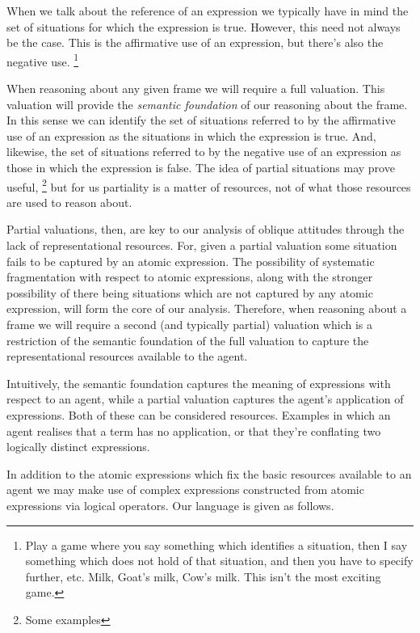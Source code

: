 \documentclass[10pt]{article}
\begin{document}
\newpage

\hfill
\printbibliography

\newpage

When we talk about the reference of an expression we typically have in mind the set of situations for which the expression is true.
However, this need not always be the case.
This is the affirmative use of an expression, but there's also the negative use.\nolinebreak
\footnote{Play a game where you say something which identifies a situation, then I say something which does not hold of that situation, and then you have to specify further, etc.
  Milk, Goat's milk, Cow's milk.
  This isn't the most exciting game.}


When reasoning about any given frame we will require a full valuation.
This valuation will provide the \emph{semantic foundation} of our reasoning about the frame.
In this sense we can identify the set of situations referred to by the affirmative use of an expression as the situations in which the expression is true.
And, likewise, the set of situations referred to by the negative use of an expression as those in which the expression is false.
The idea of partial situations may prove useful,\nolinebreak
\footnote{Some examples}
but for us partiality is a matter of resources, not of what those resources are used to reason about.

Partial valuations, then, are key to our analysis of oblique attitudes through the lack of representational resources.
For, given a partial valuation some situation fails to be captured by an atomic expression.
The possibility of systematic fragmentation with respect to atomic expressions, along with the stronger possibility of there being situations which are not captured by any atomic expression, will form the core of our analysis.
Therefore, when reasoning about a frame we will require a second (and typically partial) valuation which is a restriction of the semantic foundation of the full valuation to capture the representational resources available to the agent.

Intuitively, the semantic foundation captures the meaning of expressions with respect to an agent, while a partial valuation captures the agent's application of expressions.
Both of these can be considered resources.
Examples in which an agent realises that a term has no application, or that they're conflating two logically distinct expressions.




In addition to the atomic expressions which fix the basic resources available to an agent we may make use of complex expressions constructed from atomic expressions via logical operators.
Our language is given as follows.
\end{document}
